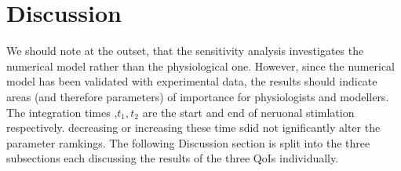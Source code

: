 \section{Discussion}
We should note at the outset, that the sensitivity analysis investigates the numerical model rather than the physiological one. However, since the numerical model has been validated with experimental data, the results should indicate areas (and therefore parameters) of importance for physiologists and modellers. The integration times ,$t_1,t_2$ are the start and end of neruonal stimlation respectively. decreasing or increasing these time sdid not ignificantly alter the parameter ramkings. The following Discussion section is split into the three subsections each discussing the results of the three QoIs individually. 
